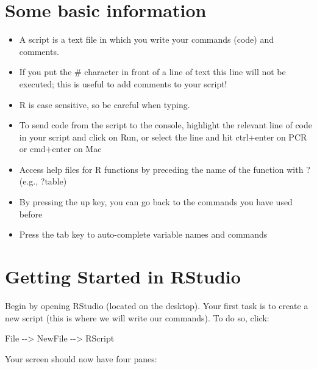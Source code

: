 \documentclass[
  letterpaper,
  DIV=11,
  numbers=noendperiod]{scrreprt}
\newenvironment{Shaded}{\begin{snugshade}}{\end{snugshade}}
\newcommand{\NormalTok}[1]{\textcolor[rgb]{0.00,0.23,0.31}{#1}}
\newcommand{\OtherTok}[1]{\textcolor[rgb]{0.00,0.23,0.31}{#1}}
\newcommand{\SpecialCharTok}[1]{\textcolor[rgb]{0.37,0.37,0.37}{#1}}
\begin{document}
\hypertarget{some-basic-information}{%
\section*{Some basic information}\label{some-basic-information}}

\begin{itemize}
\item
  A script is a text file in which you write your commands (code) and
  comments.
\item
  If you put the \# character in front of a line of text this line will
  not be executed; this is useful to add comments to your script!
\item
  R is case sensitive, so be careful when typing.
\item
  To send code from the script to the console, highlight the relevant
  line of code in your script and click on Run, or select the line and
  hit ctrl+enter on PCR or cmd+enter on Mac
\item
  Access help files for R functions by preceding the name of the
  function with ? (e.g., ?table)
\item
  By pressing the up key, you can go back to the commands you have used
  before
\item
  Press the tab key to auto-complete variable names and commands
\end{itemize}

\hypertarget{getting-started-in-rstudio}{%
\section*{Getting Started in RStudio}\label{getting-started-in-rstudio}}

Begin by opening RStudio (located on the desktop). Your first task is to
create a new script (this is where we will write our commands). To do
so, click:

\begin{Shaded}
\begin{Highlighting}[]
\NormalTok{File }\SpecialCharTok{{-}}\OtherTok{{-}\textgreater{}}\NormalTok{ NewFile }\SpecialCharTok{{-}}\OtherTok{{-}\textgreater{}}\NormalTok{ RScript}
\end{Highlighting}
\end{Shaded}

Your screen should now have four panes:
\end{document}
